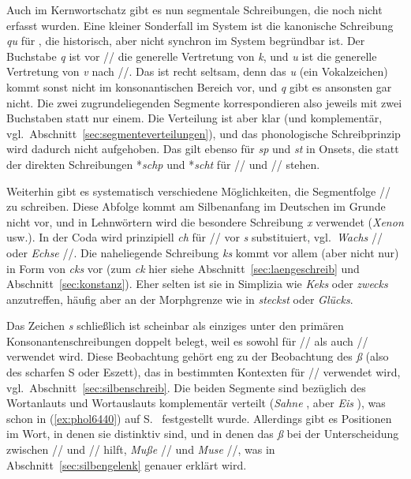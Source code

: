Auch im Kernwortschatz gibt es nun segmentale Schreibungen, die noch nicht erfasst wurden.
Eine kleiner Sonderfall im System ist die kanonische Schreibung \textit{qu} für \textipa{[kv]}, die historisch, aber nicht synchron im System begründbar ist.
Der Buchstabe \textit{q} ist vor // die generelle Vertretung von \textit{k}, und \textit{u} ist die generelle Vertretung von \textit{v} nach //.
Das ist recht seltsam, denn das \textit{u} (ein Vokalzeichen) kommt sonst nicht im konsonantischen Bereich vor, und \textit{q} gibt es ansonsten gar nicht.
Die zwei zugrundeliegenden Segmente korrespondieren also jeweils mit zwei Buchstaben statt nur einem.
Die Verteilung ist aber klar (und komplementär, vgl.\ Abschnitt~\ref{sec:segmenteverteilungen}), und das phonologische Schreibprinzip wird dadurch nicht aufgehoben.
Das gilt ebenso für \textit{sp} und \textit{st} in Onsets, die statt der direkten Schreibungen *\textit{schp} und *\textit{scht} für // und // stehen.

\enlargethispage{1\baselineskip}
Weiterhin gibt es systematisch verschiedene Möglichkeiten, die Segmentfolge // zu schreiben.
Diese Abfolge kommt am Silbenanfang im Deutschen im Grunde nicht vor, und in Lehnwörtern wird die besondere Schreibung \textit{x} verwendet (\textit{Xenon} usw.).
In der Coda wird prinzipiell \textit{ch} für // vor \textit{s} substituiert, vgl.\ \textit{Wachs} // oder \textit{Echse} //.
Die naheliegende Schreibung \textit{ks} kommt vor allem (aber nicht nur) in Form von \textit{cks} vor (zum \textit{ck} hier siehe Abschnitt~\ref{sec:laengeschreib} und Abschnitt~\ref{sec:konstanz}).
Eher selten ist sie in Simplizia wie \textit{Keks} oder \textit{zwecks} anzutreffen, häufig aber an der Morphgrenze wie in \textit{steckst} oder \textit{Glücks}.

Das Zeichen \textit{s} schließlich ist scheinbar als einziges unter den primären Konsonantenschreibungen doppelt belegt, weil es sowohl für // als auch // verwendet wird.
Diese Beobachtung gehört eng zu der Beobachtung des \textit{ß} (also des scharfen S oder Eszett), das in bestimmten Kontexten für // verwendet wird, vgl.\ Abschnitt~\ref{sec:silbenschreib}.
Die beiden Segmente sind bezüglich des Wortanlauts und Wortauslauts komplementär verteilt (\textit{Sahne} \textipa{[za:n@]}, aber \textit{Eis} \textipa{[P\t{aE}s]}), was schon in (\ref{ex:phol6440}) auf S.~\pageref{ex:phol6440} festgestellt wurde.
Allerdings gibt es Positionen im Wort, in denen sie distinktiv sind, und in denen das \textit{ß} bei der Unterscheidung zwischen // und // hilft, \zB \textit{Muße} // und \textit{Muse} //, was in Abschnitt~\ref{sec:silbengelenk} genauer erklärt wird.


